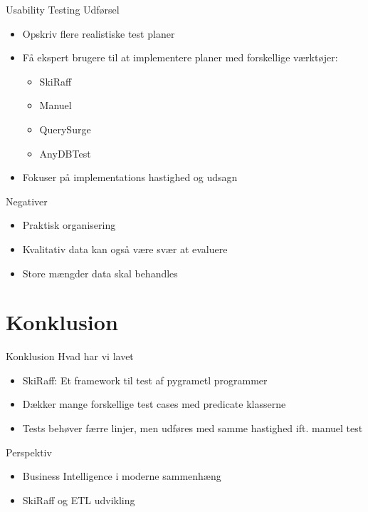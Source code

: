 \begin{frame}{Usability Testing}{}
Udførsel
  \begin{itemize}
    \item<1-> Opskriv flere realistiske test planer
    \item<2-> Få ekspert brugere til at implementere planer med forskellige værktøjer:
	 \begin{itemize}
   	 \item<2-> SkiRaff
    	\item<2-> Manuel
    	\item<2-> QuerySurge
	\item<2-> AnyDBTest
  	\end{itemize}
   \item<3-> Fokuser på implementations hastighed og udsagn
  	\end{itemize}

\pause
\pause
\pause
Negativer
 \begin{itemize}
   \item<4-> Praktisk organisering
    \item<5-> Kvalitativ data kan også være svær at evaluere
    \item<6-> Store mængder data skal behandles
  \end{itemize}
\end{frame}


\section{Konklusion}
\begin{frame}{Konklusion}{}
  Hvad har vi lavet
  \begin{itemize}
    \item<1-> SkiRaff: Et framework til test af pygrametl programmer
    \item<2-> Dækker mange forskellige test cases med predicate klasserne
    \item<3-> Tests behøver færre linjer, men udføres med samme hastighed ift. manuel test
  \end{itemize}
\pause
\pause
\pause
Perspektiv
  \begin{itemize}
    \item<4-> Business Intelligence i moderne sammenhæng
    \item<5-> SkiRaff og ETL udvikling
  \end{itemize}


\end{frame}